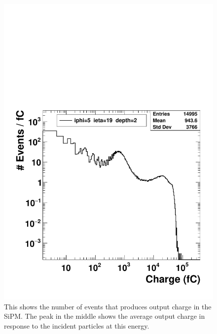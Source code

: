 \begin{figure}
\centering
\includegraphics[width=0.7\linewidth]{Figures/pioncharge.pdf}
\caption{This shows the number of events that produces output charge in the SiPM. The peak in the middle shows the average output charge in response to the incident particles at this energy.}
\label{fig:pioncharge}
\end{figure}

